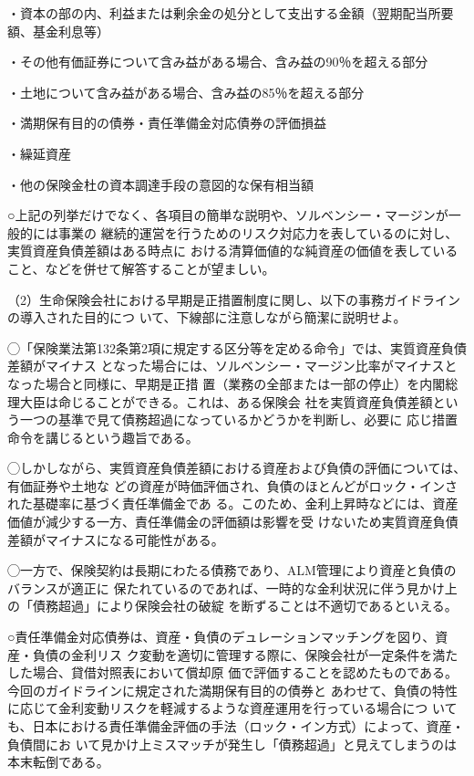 \documentclass[report,gutter=10mm,fore-edge=10mm,uplatex,dvipdfmx]{jlreq}
\begin{document}
・資本の部の内、利益または剰余金の処分として支出する金額（翌期配当所要額、基金利息等）

・その他有価証券について含み益がある場合、含み益の90％を超える部分

・土地について含み益がある場合、含み益の85％を超える部分

・満期保有目的の債券・責任準備金対応債券の評価損益

・繰延資産

・他の保険金杜の資本調達手段の意図的な保有相当額

○上記の列挙だけでなく、各項目の簡単な説明や、ソルベンシー・マージンが一般的には事業の
継続的運営を行うためのリスク対応力を表しているのに対し、実質資産負債差額はある時点に
おける清算価値的な純資産の価値を表していること、などを併せて解答することが望ましい。


（2）生命保険会社における早期是正措置制度に関し、以下の事務ガイドラインの導入された目的につ
いて、下線部に注意しながら簡潔に説明せよ。

◯「保険業法第132条第2項に規定する区分等を定める命令」では、実質資産負債差額がマイナス
となった場合には、ソルベンシー・マージン比率がマイナスとなった場合と同様に、早期是正措
置（業務の全部または一部の停止）を内閣総理大臣は命じることができる。これは、ある保険会
社を実質資産負債差額という一つの基準で見て債務超過になっているかどうかを判断し、必要に
応じ措置命令を講じるという趣旨である。

◯しかしながら、実質資産負債差額における資産および負債の評価については、有価証券や土地な
どの資産が時価評価され、負債のほとんどがロック・インされた基礎率に基づく責任準備金であ
る。このため、金利上昇時などには、資産価値が減少する一方、責任準備金の評価額は影響を受
けないため実質資産負債差額がマイナスになる可能性がある。

◯一方で、保険契約は長期にわたる債務であり、ALM管理により資産と負債のバランスが適正に
保たれているのであれば、一時的な金利状況に伴う見かけ上の「債務超過」により保険会社の破綻
を断ずることは不適切であるといえる。

○責任準備金対応債券は、資産・負債のデュレーションマッチングを図り、資産・負債の金利リス
ク変動を適切に管理する際に、保険会社が一定条件を満たした場合、貸借対照表において償却原
価で評価することを認めたものである。今回のガイドラインに規定された満期保有目的の債券と
あわせて、負債の特性に応じて金利変動リスクを軽減するような資産運用を行っている場合につ
いても、日本における責任準備金評価の手法（ロック・イン方式）によって、資産・負債間にお
いて見かけ上ミスマッチが発生し「債務超過」と見えてしまうのは本末転倒である。
\end{document}
